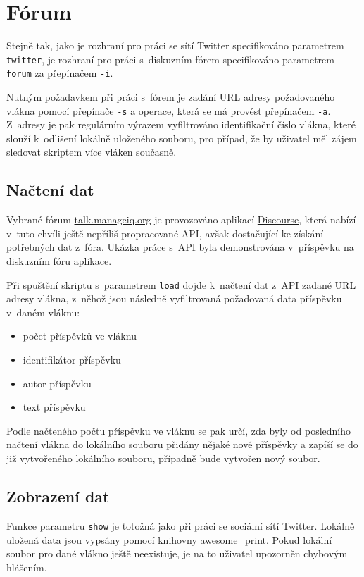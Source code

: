 \documentclass[11pt,a4paper]{article}
\begin{document}
  \section{Fórum}

    Stejně tak, jako je rozhraní pro práci se sítí Twitter specifikováno
    parametrem \texttt{twitter}, je rozhraní pro práci s~diskuzním fórem
    specifikováno parametrem \texttt{forum} za přepínačem \texttt{-i}.

    Nutným požadavkem při práci s~fórem je zadání URL adresy požadovaného
    vlákna pomocí přepínače \texttt{-s} a operace, která se má provést
    přepínačem \texttt{-a}. Z~adresy je pak regulárním výrazem vyfiltrováno
    identifikační číslo vlákna, které slouží k~odlišení lokálně uloženého
    souboru, pro případ, že by uživatel měl zájem sledovat skriptem více vláken
    současně.

    \subsection{Načtení dat}

      Vybrané fórum \href{http://talk.manageiq.org}{talk.manageiq.org} je
      provozováno aplikací \href{http://www.discourse.org}{Discourse},
      která nabízí v~tuto chvíli ještě nepříliš propracované API,
      avšak dostačující ke získání potřebných dat z~fóra.
      Ukázka práce s~API byla demonstrována
      v~\href{https://meta.discourse.org/t/discourse-api-documentation/22706}
      {příspěvku} na diskuzním fóru aplikace.

      Při spuštění skriptu s~parametrem \texttt{load} dojde k~načtení
      dat z~API zadané URL adresy vlákna, z~něhož jsou následně vyfiltrovaná
      požadovaná data příspěvku v~daném vláknu:

      \begin{itemize}
        \item počet příspěvků ve vláknu
        \item identifikátor příspěvku
        \item autor příspěvku
        \item text příspěvku
      \end{itemize}

      Podle načteného počtu příspěvku ve vláknu se pak určí, zda byly od
      posledního načtení vlákna do lokálního souboru přidány nějaké nové
      příspěvky a zapíší se do již vytvořeného lokálního souboru, případně
      bude vytvořen nový soubor.

    \subsection{Zobrazení dat}

      Funkce parametru \texttt{show} je totožná jako při práci se sociální
      sítí Twitter. Lokálně uložená data jsou vypsány pomocí knihovny
      \href{https://github.com/michaeldv/awesome_print}{awesome\_print}.
      Pokud lokální soubor pro dané vlákno ještě neexistuje, je na to uživatel
      upozorněn chybovým hlášením.
\end{document}
